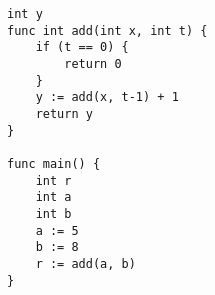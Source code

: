 \begin{lstlisting}[caption={A small recursive program}, label={ex02}]
int y
func int add(int x, int t) {
	if (t == 0) {
	    return 0
	}
	y := add(x, t-1) + 1
	return y
}

func main() {
	int r
	int a
	int b
	a := 5
	b := 8
	r := add(a, b)
}
\end{lstlisting}